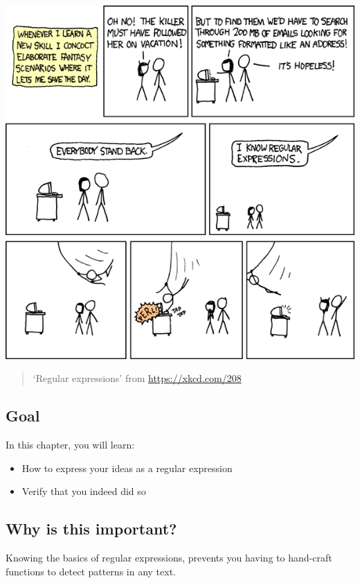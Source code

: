 \documentclass[]{book}
\providecommand{\tightlist}{%
  \setlength{\itemsep}{0pt}\setlength{\parskip}{0pt}}
\begin{document}
\includegraphics{data/06_regular_expressions.png}

\begin{quote}
`Regular expressions' from \url{https://xkcd.com/208}
\end{quote}

\hypertarget{goal}{%
\subsection{Goal}\label{goal}}

In this chapter, you will learn:

\begin{itemize}
\tightlist
\item
  How to express your ideas as a regular expression
\item
  Verify that you indeed did so
\end{itemize}

\hypertarget{why-is-this-important}{%
\subsection{Why is this important?}\label{why-is-this-important}}

Knowing the basics of regular expressions, prevents you having
to hand-craft functions to detect patterns in any text.
\end{document}
